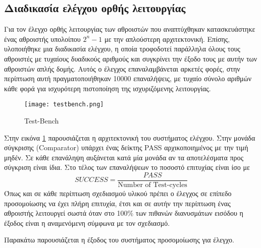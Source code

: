\clearpage
\subsection{Διαδικασία ελέγχου ορθής λειτουργίας}
Για τον έλεγχο ορθής λειτουργίας των αθροιστών που αναπτύχθηκαν κατασκευάστηκε ένας αθροιστής 
υπολοίπου $2^n-1$ με την απλούστερη αρχιτεκτονική. Επίσης, υλοποιήθηκε μια διαδικασία ελέγχου,
η οποία τροφοδοτεί παράλληλα όλους τους αθροιστές με τυχαίους δυαδικούς αριθμούς και συγκρίνει 
την έξοδο τους με αυτήν των αθροιστών απλής δομής. Αυτός ο έλεγχος επαναλαμβάνεται αρκετές 
φορές, στην περίπτωση αυτή πραγματοποιήθηκαν 10000 επαναλήψεις, με τυχαίο σύνολο αριθμών 
κάθε φορά για ισχυρότερη πιστοποίηση της ισχυριζόμενης λειτουργίας.
\begin{figure}[H]
    \centering
    \texttt{[image: testbench.png]}
    \caption{Test-Bench}
    \label{fig:testbench}
\end{figure}
Στην εικόνα \ref{fig:testbench} παρουσιάζεται η αρχιτεκτονική του συστήματος ελέγχου. Στην 
μονάδα σύγκρισης (Comparator) υπάρχει ένας δείκτης PASS αρχικοποιημένος με την τιμή μηδέν.
Σε κάθε επανάληψη αυξάνεται κατά μία μονάδα αν τα αποτελέσματα προς σύγκριση είναι ίδια.
Στο τέλος των επαναλήψεων το ποσοστό επιτυχίας είναι ίσο με 
\begin{equation*}
    SUCCESS = \frac{PASS}{\text{Number of Test-cycles}}
\end{equation*}
Όπως και σε κάθε περίπτωση σχεδιασμού υλικού πρέπει ο έλεγχος σε επίπεδο προσομοίωσης να
έχει πλήρη επιτυχία, έτσι και σε αυτήν την περίπτωση ένας αθροιστής λειτουργεί σωστά όταν 
στο 100\% των πιθανών διανυσμάτων εισόδου η έξοδος είναι η αναμενόμενη σύμφωνα με τον σχεδιασμό.

Παρακάτω παρουσιάζεται η έξοδος του συστήματος προσομοίωσης για έλεγχο.



